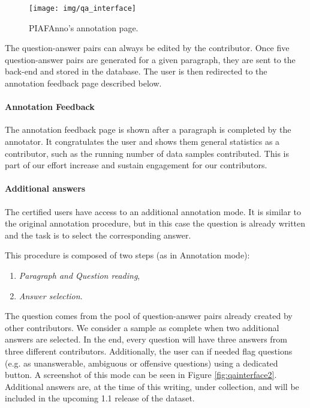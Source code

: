 \documentclass[10pt, a4paper]{article}
\begin{document}
\begin{figure}[t!]
	\centering
	\texttt{[image: img/qa\_interface]}
	\caption{PIAFAnno's annotation page.}
	\label{fig:qainterface}
\end{figure}

The question-answer pairs can always be edited by the contributor. Once five question-answer pairs are generated for a given paragraph, they are sent to the back-end and stored in the database. The user is then redirected to the annotation feedback page described below.

\paragraph{Annotation Feedback}

The annotation feedback page is shown after a paragraph is completed by the annotator. It congratulates the user and shows them general statistics as a contributor, such as the running number of data samples contributed. This is part of our effort increase and sustain engagement for our contributors.

\paragraph{Additional answers}

The certified users have access to an additional annotation mode. It is similar to the original annotation procedure, but in this case the question is already written and the task is to select the corresponding answer.

This procedure is composed of two steps (as in Annotation mode):
\begin{enumerate}
\item \textit{Paragraph and Question reading},
\item \textit{Answer selection}.
\end{enumerate}

The question comes from the pool of question-answer pairs already created by other contributors. We consider a sample as complete when two additional answers are selected. In the end, every question will have three answers from three different contributors. Additionally, the user can if needed flag questions (e.g. as unanswerable, ambiguous or offensive questions) using a dedicated button. A screenshot of this mode can be seen in Figure \ref{fig:qainterface2}. Additional answers are, at the time of this writing, under collection, and will be included in the upcoming 1.1 release of the dataset.
\end{document}
